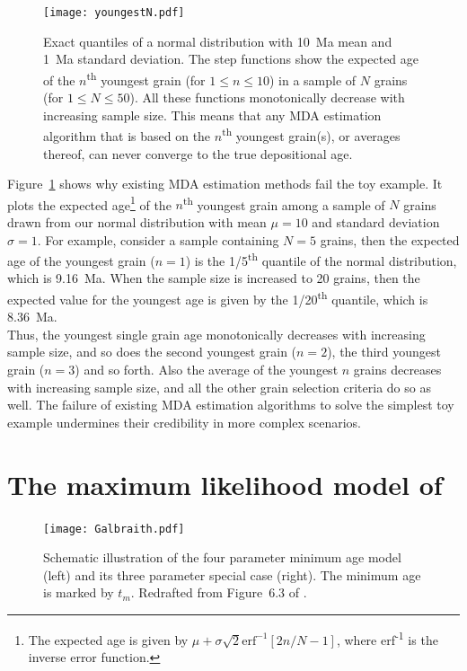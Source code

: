 \documentclass{article}
\begin{document}
\begin{figure}[!ht]
  \centering \texttt{[image: youngestN.pdf]}
  \parbox{.6\textwidth}{
    \caption{Exact quantiles of a normal distribution with 10~Ma mean and
      1~Ma standard deviation. The step functions show the expected age of
      the $n$\textsuperscript{th} youngest grain (for $1 \leq n \leq 10$)
      in a sample of $N$ grains (for $1 \leq N \leq 50$). All these
      functions monotonically decrease with increasing sample size. This
      means that any MDA estimation algorithm that is based on the
      $n$\textsuperscript{th} youngest grain(s), or averages thereof, can
      never converge to the true depositional age.}
    \label{fig:youngestN}
  }
\end{figure}

Figure~\ref{fig:youngestN} shows why existing MDA estimation methods
fail the toy example. It plots the expected age\footnote{The expected
  age is given by $\mu + \sigma\sqrt{2} \mbox{erf}^{-1} \left[2 n/N -
    1\right]$, where erf\textsuperscript{-1} is the inverse error
  function.} of the $n$\textsuperscript{th} youngest grain among a
sample of $N$ grains drawn from our normal distribution with mean $\mu
= 10$ and standard deviation $\sigma = 1$.  For example, consider a
sample containing $N = 5$ grains, then the expected age of the
youngest grain ($n = 1$) is the 1/5\textsuperscript{th} quantile of
the normal distribution, which is 9.16~Ma. When the sample size is
increased to 20 grains, then the expected value for the youngest age
is given by the 1/20\textsuperscript{th} quantile, which is 8.36~Ma.\\

Thus, the youngest single grain age monotonically decreases with
increasing sample size, and so does the second youngest grain ($n =
2$), the third youngest grain ($n = 3$) and so forth. Also the average
of the youngest $n$ grains decreases with increasing sample size, and
all the other grain selection criteria do so as well. The failure of
existing MDA estimation algorithms to solve the simplest toy example
undermines their credibility in more complex scenarios.

\section{The maximum likelihood model of \citet{galbraith1993}}
\label{sec:galbraith}

\begin{figure}[!ht]
  \centering
  \texttt{[image: Galbraith.pdf]}
  \parbox{.8\textwidth}{
    \caption{Schematic illustration of the four parameter minimum age
      model (left) and its three parameter special case (right). The
      minimum age is marked by $t_m$. Redrafted from Figure~6.3 of
      \citet{galbraith2005}.}
    \label{fig:galbraith}
  }
\end{figure}
\end{document}

